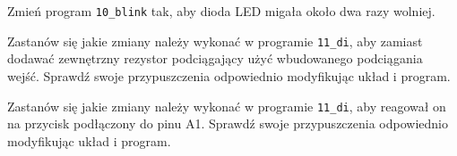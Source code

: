 % 
% 
% 
% 


\dbEntryCheckResults
  Zmień program \Verb$10_blink$ tak, aby dioda LED migała około dwa razy wolniej.
\fi

\dbEntryCheckResults
  Zastanów się jakie zmiany należy wykonać w programie \Verb$11_di$, aby zamiast dodawać zewnętrzny rezystor podciągający użyć wbudowanego podciągania wejść.
  Sprawdź swoje przypuszczenia odpowiednio modyfikując układ i program.
\fi

\dbEntryCheckResults
  Zastanów się jakie zmiany należy wykonać w programie \Verb$11_di$, aby reagował on na przycisk podłączony do pinu A1.
  Sprawdź swoje przypuszczenia odpowiednio modyfikując układ i program.
\fi

